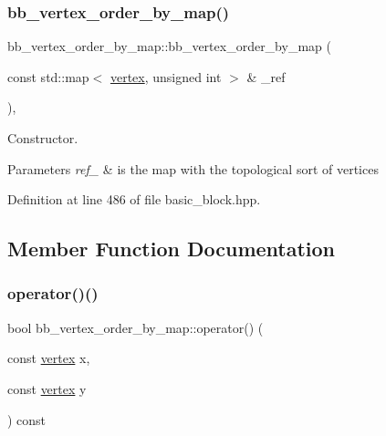 \subsubsection{\texorpdfstring{bb\+\_\+vertex\+\_\+order\+\_\+by\+\_\+map()}{bb\_vertex\_order\_by\_map()}}
{\footnotesize\ttfamily bb\+\_\+vertex\+\_\+order\+\_\+by\+\_\+map\+::bb\+\_\+vertex\+\_\+order\+\_\+by\+\_\+map (\begin{DoxyParamCaption}\item[{const std\+::map$<$ \hyperlink{graph_8hpp_abefdcf0544e601805af44eca032cca14}{vertex}, unsigned int $>$ \&}]{\+\_\+ref }\end{DoxyParamCaption})\hspace{0.3cm}{\ttfamily [inline]}, {\ttfamily [explicit]}}



Constructor. 


\begin{DoxyParams}{Parameters}
{\em ref\+\_\+} & is the map with the topological sort of vertices \\
\hline
\end{DoxyParams}


Definition at line 486 of file basic\+\_\+block.\+hpp.



\subsection{Member Function Documentation}
\mbox{\label{classbb__vertex__order__by__map_a03f22e5a78bd9812aec0bcf74325ee8a}} 
\subsubsection{\texorpdfstring{operator()()}{operator()()}}
{\footnotesize\ttfamily bool bb\+\_\+vertex\+\_\+order\+\_\+by\+\_\+map\+::operator() (\begin{DoxyParamCaption}\item[{const \hyperlink{graph_8hpp_abefdcf0544e601805af44eca032cca14}{vertex}}]{x,  }\item[{const \hyperlink{graph_8hpp_abefdcf0544e601805af44eca032cca14}{vertex}}]{y }\end{DoxyParamCaption}) const\hspace{0.3cm}{\ttfamily [inline]}}



